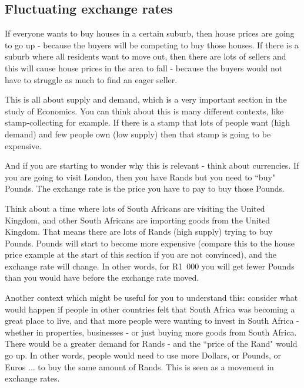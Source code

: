            \subsection{ Fluctuating exchange rates}
            \nopagebreak
        \label{m39335*id68515}If everyone wants to buy houses in a certain suburb, then house prices are going to go up - because the buyers will be competing to buy those houses. If there is a suburb where all residents want to move out, then there are lots of sellers and this will cause house prices in the area to fall - because the buyers would not have to struggle as much to find an eager seller.\par 
        \label{m39335*id68522}This is all about supply and demand, which is a very important section in the study of Economics. You can think about this is many different contexts, like stamp-collecting for example. If there is a stamp that lots of people want (high demand) and few people own (low supply) then that stamp is going to be expensive.\par 
        \label{m39335*id68528}And if you are starting to wonder why this is relevant - think about currencies. If you are going to visit London, then you have Rands but you need to ``buy" Pounds. The exchange rate is the price you have to pay to buy those Pounds.\par 
        \label{m39335*id68535}Think about a time where lots of South Africans are visiting the United Kingdom, and other South Africans are importing goods from the United Kingdom. That means there are lots of Rands (high supply) trying to buy Pounds. Pounds will start to become more expensive (compare this to the house price example at the start of this section if you are not convinced), and the exchange rate will change. In other words, for R1~000 you will get fewer Pounds than you would have before the exchange rate moved.\par 
        \label{m39335*id68547}Another context which might be useful for you to understand this: consider what would happen if people in other countries felt that South Africa was becoming a great place to live, and that more people were wanting to invest in South Africa - whether in properties, businesses - or just buying more goods from South Africa. There would be a greater demand for Rands - and the ``price of the Rand" would go up. In other words, people would need to use more Dollars, or Pounds, or Euros ... to buy the same amount of Rands. This is seen as a movement in exchange rates.\par 
